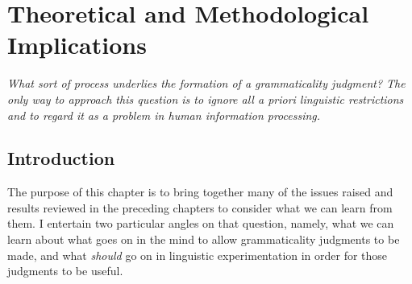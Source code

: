 \chapter{Theoretical and Methodological Implications}\label{sec:6}

\epigraph{\itshape What sort of process underlies the formation of a grammaticality judgment? The only way to approach this question is to ignore all \emph{a priori} linguistic restrictions and to regard it as a problem in human information processing.\\[-2\baselineskip]}{\citep{LeveltEtAl1977}}

\section{Introduction}\label{sec:6.1}

The purpose of this chapter is to bring together many of the issues raised and results reviewed in the preceding chapters to consider what we can learn from them. I entertain two particular angles on that question, namely, what we can learn about what goes on in the mind to allow grammaticality judgments to be made, and what \textit{should} go on in linguistic experimentation in order for those judgments to be useful.

